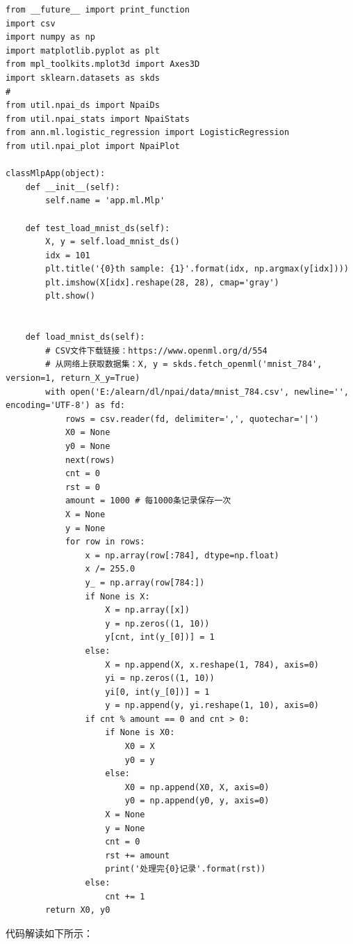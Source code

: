 \documentclass[UTF8]{article}
\begin{document}
\begin{lstlisting}
from __future__ import print_function
import csv
import numpy as np
import matplotlib.pyplot as plt
from mpl_toolkits.mplot3d import Axes3D
import sklearn.datasets as skds
#
from util.npai_ds import NpaiDs
from util.npai_stats import NpaiStats
from ann.ml.logistic_regression import LogisticRegression
from util.npai_plot import NpaiPlot

classMlpApp(object):
    def __init__(self):
        self.name = 'app.ml.Mlp'

    def test_load_mnist_ds(self):
        X, y = self.load_mnist_ds()
        idx = 101
        plt.title('{0}th sample: {1}'.format(idx, np.argmax(y[idx])))
        plt.imshow(X[idx].reshape(28, 28), cmap='gray')
        plt.show()


    def load_mnist_ds(self):
        # CSV文件下载链接：https://www.openml.org/d/554
        # 从网络上获取数据集：X, y = skds.fetch_openml('mnist_784', version=1, return_X_y=True)
        with open('E:/alearn/dl/npai/data/mnist_784.csv', newline='', encoding='UTF-8') as fd:
            rows = csv.reader(fd, delimiter=',', quotechar='|')
            X0 = None
            y0 = None
            next(rows)
            cnt = 0
            rst = 0
            amount = 1000 # 每1000条记录保存一次
            X = None
            y = None
            for row in rows:
                x = np.array(row[:784], dtype=np.float)
                x /= 255.0
                y_ = np.array(row[784:])
                if None is X:
                    X = np.array([x])
                    y = np.zeros((1, 10))
                    y[cnt, int(y_[0])] = 1
                else:
                    X = np.append(X, x.reshape(1, 784), axis=0)
                    yi = np.zeros((1, 10))
                    yi[0, int(y_[0])] = 1
                    y = np.append(y, yi.reshape(1, 10), axis=0)
                if cnt % amount == 0 and cnt > 0:
                    if None is X0:
                        X0 = X
                        y0 = y
                    else:
                        X0 = np.append(X0, X, axis=0)
                        y0 = np.append(y0, y, axis=0)
                    X = None
                    y = None
                    cnt = 0
                    rst += amount
                    print('处理完{0}记录'.format(rst))
                else:
                    cnt += 1
        return X0, y0
\end{lstlisting}
代码解读如下所示：
\end{document}
